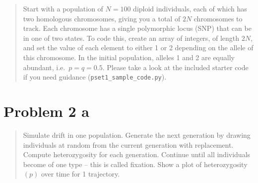 \documentclass[
  letterpaper,
  DIV=11,
  numbers=noendperiod]{scrartcl}
\begin{document}
\begin{quote}
Start with a population of \(N=100\) diploid individuals, each of which
has two homologous chromosomes, giving you a total of \(2N\) chromosomes
to track. Each chromosome has a single polymorphic locus (SNP) that can
be in one of two states. To code this, create an array of integers, of
length \(2N\), and set the value of each element to either 1 or 2
depending on the allele of this chromosome. In the initial population,
alleles 1 and 2 are equally abundant, i.e.~\(p=q=0.5\). Please take a
look at the included starter code if you need guidance
(\texttt{pset1\_sample\_code.py}).
\end{quote}

\hypertarget{problem-2-a}{%
\section{Problem 2 a}\label{problem-2-a}}

\begin{quote}
Simulate drift in one population. Generate the next generation by
drawing individuals at random from the current generation with
replacement. Compute heterozygosity for each generation. Continue until
all individuals become of one type -- this is called fixation. Show a
plot of heterozygosity \((p)\) over time for 1 trajectory.
\end{quote}
\end{document}
